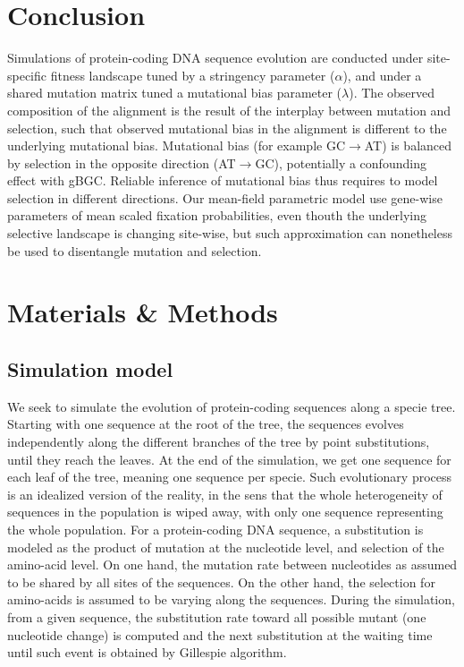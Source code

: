 \section{Conclusion}

Simulations of protein-coding DNA sequence evolution are conducted under site-specific fitness landscape tuned by a stringency parameter ($\alpha$), and under a shared mutation matrix tuned a mutational bias parameter ($\lambda$).
The observed composition of the alignment is the result of the interplay between mutation and selection, such that observed mutational bias in the alignment is different to the underlying mutational bias.
Mutational bias (for example GC$\rightarrow$AT) is balanced by selection in the opposite direction (AT$\rightarrow$GC), potentially a confounding effect with gBGC.
Reliable inference of mutational bias thus requires to model selection in different directions.
Our mean-field parametric model use gene-wise parameters of mean scaled fixation probabilities, even thouth the underlying selective landscape is changing site-wise, but such approximation can nonetheless be used to disentangle mutation and selection.


\section{Materials \& Methods}

\subsection{Simulation model}
\label{sec-mut-bias:simu}
We seek to simulate the evolution of protein-coding sequences along a specie tree.
Starting with one sequence at the root of the tree, the sequences evolves independently along the different branches of the tree by point \glspl{substitution}, until they reach the leaves.
At the end of the simulation, we get one sequence for each leaf of the tree, meaning one sequence per specie.
Such evolutionary process is an idealized version of the reality, in the sens that the whole heterogeneity of sequences in the population is wiped away, with only one sequence representing the whole population.
For a protein-coding \acrshort{DNA} sequence, a \gls{substitution} is modeled as the product of mutation at the nucleotide level, and selection of the amino-acid level.
On one hand, the mutation rate between nucleotides as assumed to be shared by all sites of the sequences.
On the other hand, the selection for amino-acids is assumed to be varying along the sequences.
During the simulation, from a given sequence, the \gls{substitution} rate toward all possible mutant (one nucleotide change) is computed and the next \gls{substitution} at the waiting time until such event is obtained by Gillespie algorithm.

